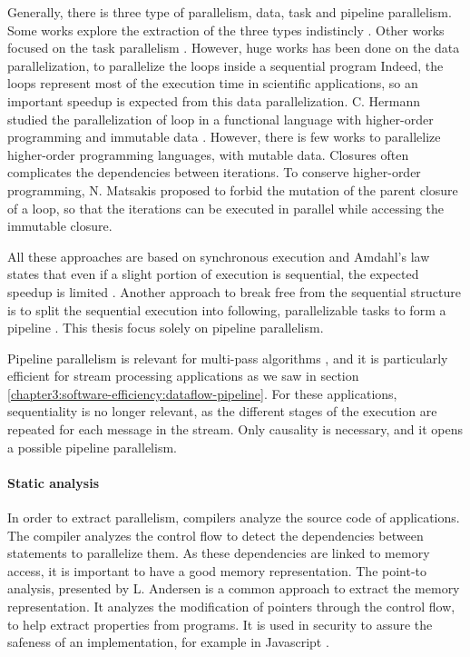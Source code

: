 Generally, there is three type of parallelism, data, task and pipeline parallelism.
Some works explore the extraction of the three types indistincly \cite{Li2012}.
Other works focused on the task parallelism \cite{Rinard1996}.
However, huge works has been done on the data parallelization, to parallelize the loops inside a sequential program \cite{Mauras1989,Amarasinghe1995,Yuki2013,Banerjee2013,Radoi2014}
Indeed, the loops represent most of the execution time in scientific applications, so an important speedup is expected from this data parallelization.
C. Hermann studied the parallelization of loop in a functional language with higher-order programming and immutable data \cite{Herrmann2000}.
However, there is few works to parallelize higher-order programming languages, with mutable data.
Closures often complicates the dependencies between iterations.
To conserve higher-order programming, N. Matsakis proposed to forbid the mutation of the parent closure of a loop, so that the iterations can be executed in parallel while accessing the immutable closure\cite{Matsakis2012a}.

All these approaches are based on synchronous execution and Amdahl's law states that even if a slight portion of execution is sequential, the expected speedup is limited \cite{Amdahl1967,Clements2013a}.
Another approach to break free from the sequential structure is to split the sequential execution into following, parallelizable tasks to form a pipeline \cite{Kamruzzaman2013,Fernandez2014a}.
This thesis focus solely on pipeline parallelism.

Pipeline parallelism is relevant for multi-pass algorithms \cite{Conway1963}, and it is particularly efficient for stream processing applications as we saw in section \ref{chapter3:software-efficiency:dataflow-pipeline}.
For these applications, sequentiality is no longer relevant, as the different stages of the execution are repeated for each message in the stream.
Only causality is necessary, and it opens a possible pipeline parallelism.


\paragraph{Static analysis}

In order to extract parallelism, compilers analyze the source code of applications.
The compiler analyzes the control flow to detect the dependencies between statements to parallelize them.
As these dependencies are linked to memory access, it is important to have a good memory representation.
The point-to analysis, presented by L. Andersen \cite{Andersen1994} is a common approach to extract the memory representation.
It analyzes the modification of pointers through the control flow, to help extract properties from programs.
It is used in security to assure the safeness of an implementation, for example in Javascript \cite{Chudnov2015}.

